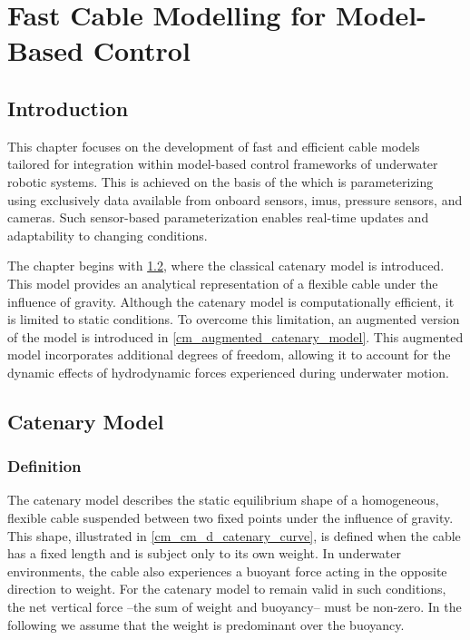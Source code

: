 \chapter{Fast Cable Modelling for Model-Based Control}
\label{cable_modelling}

\minitoc{}

\section{Introduction}
\label{cm_introduction}

This chapter focuses on the development of fast and efficient cable models tailored for integration
within model-based control frameworks of underwater robotic systems. This is achieved on the basis
of the \catenarymodel{} which is parameterizing using exclusively data available from onboard
sensors, \acp{imu}, pressure sensors, and cameras. Such sensor-based parameterization enables
real-time updates and adaptability to changing conditions.

The chapter begins with \cref{cm_catenary_model}, where the classical catenary model is introduced.
This model provides an analytical representation of a flexible cable under the influence of
gravity. Although the catenary model is computationally efficient, it is limited to static
conditions. To overcome this limitation, an augmented version of the model is introduced in
\cref{cm_augmented_catenary_model}. This augmented model incorporates additional degrees of
freedom, allowing it to account for the dynamic effects of hydrodynamic forces experienced during
underwater motion.

\section{Catenary Model}
\label{cm_catenary_model}

\subsection{Definition}
\label{cm_cm_definition}

The catenary model describes the static equilibrium shape of a homogeneous, flexible cable
suspended between two fixed points under the influence of gravity. This shape, illustrated in
\cref{cm_cm_d_catenary_curve}, is defined when the cable has a fixed length \catL{} and is subject
only to its own weight. In underwater environments, the cable also experiences a buoyant force
acting in the opposite direction to weight. For the catenary model to remain valid in such
conditions, the net vertical force --the sum of weight and buoyancy-- must be non-zero. In the
following we assume that the weight is predominant over the buoyancy.


